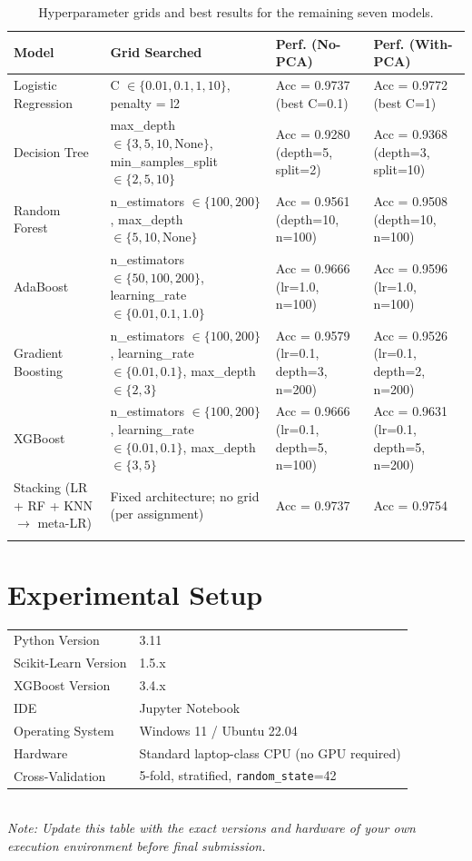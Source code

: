 \documentclass[12pt,a4paper]{article}
\begin{document}
\begin{longtable}{|p{2.6cm}|p{4cm}|p{2.6cm}|p{2.6cm}|}
\hline
\textbf{Model} & \textbf{Grid Searched} & \textbf{Perf. (No-PCA)} & \textbf{Perf. (With-PCA)} \\ \hline
Logistic Regression & C $\in \{0.01, 0.1, 1, 10\}$, penalty = l2 & Acc = 0.9737 (best C=0.1) & Acc = 0.9772 (best C=1) \\ \hline
Decision Tree & max\_depth $\in \{3,5,10,\text{None}\}$, min\_samples\_split $\in \{2,5,10\}$ & Acc = 0.9280 (depth=5, split=2) & Acc = 0.9368 (depth=3, split=10) \\ \hline
Random Forest & n\_estimators $\in \{100,200\}$, max\_depth $\in \{5,10,\text{None}\}$ & Acc = 0.9561 (depth=10, n=100) & Acc = 0.9508 (depth=10, n=100) \\ \hline
AdaBoost & n\_estimators $\in \{50,100,200\}$, learning\_rate $\in \{0.01,0.1,1.0\}$ & Acc = 0.9666 (lr=1.0, n=100) & Acc = 0.9596 (lr=1.0, n=100) \\ \hline
Gradient Boosting & n\_estimators $\in \{100,200\}$, learning\_rate $\in \{0.01,0.1\}$, max\_depth $\in \{2,3\}$ & Acc = 0.9579 (lr=0.1, depth=3, n=200) & Acc = 0.9526 (lr=0.1, depth=2, n=200) \\ \hline
XGBoost & n\_estimators $\in \{100,200\}$, learning\_rate $\in \{0.01,0.1\}$, max\_depth $\in \{3,5\}$ & Acc = 0.9666 (lr=0.1, depth=5, n=100) & Acc = 0.9631 (lr=0.1, depth=5, n=200) \\ \hline
Stacking (LR + RF + KNN $\rightarrow$ meta-LR) & Fixed architecture; no grid (per assignment) & Acc = 0.9737 & Acc = 0.9754 \\ \hline
\caption{Hyperparameter grids and best results for the remaining seven models.}
\label{tab:remaining}
\end{longtable}

\section{Experimental Setup}
\begin{tabular}{ll}
\toprule
Python Version & 3.11 \\
Scikit-Learn Version & 1.5.x \\
XGBoost Version & 3.4.x \\
IDE & Jupyter Notebook \\
Operating System & Windows 11 / Ubuntu 22.04 \\
Hardware & Standard laptop-class CPU (no GPU required) \\
Cross-Validation & 5-fold, stratified, \texttt{random\_state}=42 \\
\bottomrule
\end{tabular}
\vspace{0.3em}
\\ \textit{Note: Update this table with the exact versions and hardware of your own execution environment before final submission.}
\end{document}
